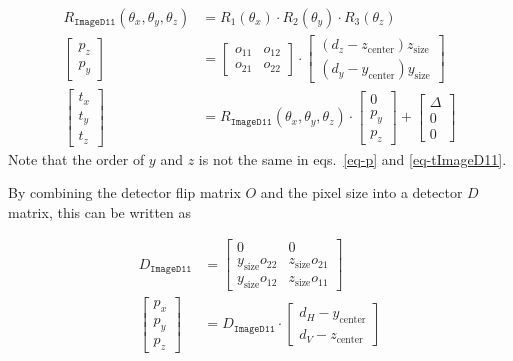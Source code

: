 \documentclass[12pt]{article}
\begin{document}
\begin{align}
  R_{\mathtt{ImageD11}}(\theta_x, \theta_y, \theta_z)
  & =
  R_1(\theta_x) \cdot R_2(\theta_y) \cdot R_3(\theta_z)
  \\
  \begin{bmatrix}
    p_z \\ p_y
  \end{bmatrix}
  & =
  \begin{bmatrix}
    o_{11} & o_{12}
    \\ o_{21} & o_{22}
  \end{bmatrix}
  \cdot
  \begin{bmatrix}
    (d_z - z_{\mathrm{center}}) z_{\mathrm{size}} \\
    (d_y - y_{\mathrm{center}}) y_{\mathrm{size}}
  \end{bmatrix}
  \label{eq-p}
  \\
  \begin{bmatrix}
    t_x \\ t_y \\ t_z
  \end{bmatrix}
  & =
  R_{\mathtt{ImageD11}}(\theta_x, \theta_y, \theta_z)
  \cdot
  \begin{bmatrix}
    0 \\ p_y \\ p_z
  \end{bmatrix}
  +
  \begin{bmatrix}
    \Delta \\ 0 \\ 0
  \end{bmatrix}
  \label{eq-tImageD11}
\end{align}
Note that the order of $y$ and $z$ is not the same in eqs.~\ref{eq-p}
and \ref{eq-tImageD11}.

By combining the detector flip matrix $O$ and the pixel size into a
detector $D$ matrix, this can be written as

\begin{align}
  D_{\mathtt{ImageD11}}
  & =
  \begin{bmatrix}
    0 & 0 \\
    y_{\mathrm{size}} o_{22} & z_{\mathrm{size}} o_{21} \\
    y_{\mathrm{size}} o_{12} & z_{\mathrm{size}} o_{11}
  \end{bmatrix}
  \label{eq-DImageD11}
  \\
  \begin{bmatrix} p_x \\ p_y \\ p_z \end{bmatrix}
  & =
  D_{\mathtt{ImageD11}} \cdot
  \begin{bmatrix}
    d_H - y_{\mathrm{center}} \\
    d_V - z_{\mathrm{center}}
  \end{bmatrix}
\end{align}
\end{document}
